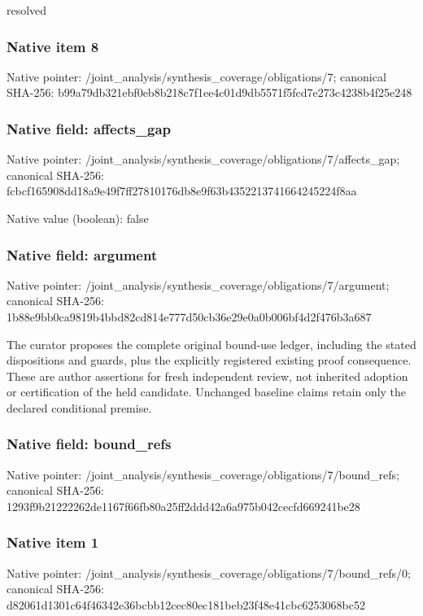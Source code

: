 \documentclass[10pt,a4paper]{article}
\begin{document}
\begingroup\raggedright\sloppy resolved\par\endgroup

\subsubsection{Native item 8}
Native pointer: /joint\_\allowbreak{}analysis/synthesis\_\allowbreak{}coverage/obligations/7; canonical SHA-256: b99a79db321ebf0eb8b218c7f1ee4c01d9db5571f5fcd7e273c4238b4f25e248

\subsubsection{Native field: affects\_\allowbreak{}gap}
Native pointer: /joint\_\allowbreak{}analysis/synthesis\_\allowbreak{}coverage/obligations/7/affects\_\allowbreak{}gap; canonical SHA-256: fcbcf165908dd18a9e49f7ff27810176db8e9f63b4352213741664245224f8aa

Native value (boolean): false

\subsubsection{Native field: argument}
Native pointer: /joint\_\allowbreak{}analysis/synthesis\_\allowbreak{}coverage/obligations/7/argument; canonical SHA-256: 1b88e9bb0ca9819b4bbd82cd814e777d50cb36e29e0a0b006bf4d2f476b3a687

\begingroup\raggedright\sloppy The curator proposes the complete original bound-use ledger,\allowbreak{} including the stated dispositions and guards,\allowbreak{} plus the explicitly registered existing proof consequence. These are author assertions for fresh independent review,\allowbreak{} not inherited adoption or certification of the held candidate. Unchanged baseline claims retain only the declared conditional premise.\par\endgroup

\subsubsection{Native field: bound\_\allowbreak{}refs}
Native pointer: /joint\_\allowbreak{}analysis/synthesis\_\allowbreak{}coverage/obligations/7/bound\_\allowbreak{}refs; canonical SHA-256: 1293f9b21222262de1167f66fb80a25ff2ddd42a6a975b042cecfd669241be28

\subsubsection{Native item 1}
Native pointer: /joint\_\allowbreak{}analysis/synthesis\_\allowbreak{}coverage/obligations/7/bound\_\allowbreak{}refs/0; canonical SHA-256: d82061d1301c64f46342e36bcbb12cec80ec181beb23f48e41cbc6253068bc52
\end{document}
